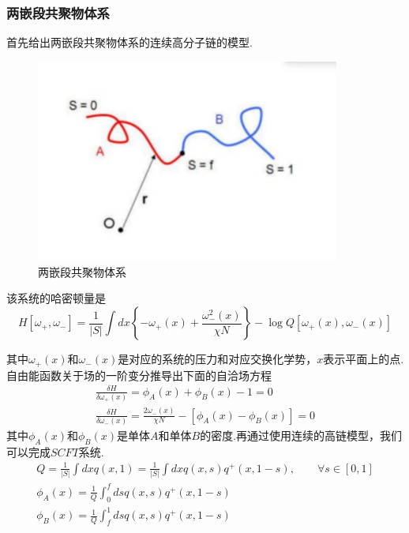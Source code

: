 \documentclass[12pt]{article}
\begin{document}
\begin{CJK}{UTF8}{gkai}
    \subsubsection{两嵌段共聚物体系}
    
      首先给出两嵌段共聚物体系的连续高分子链的模型.\\
      
    \begin{figure}[H] 
     \centering
     \includegraphics[width=10cm]{scft.jpg}
     \caption{两嵌段共聚物体系}
    \end{figure}
    
    该系统的哈密顿量是\\
    \begin{equation}
    H[\omega_+,\omega_-]=\frac{1}{|S|}\int dx\left\lbrace -\omega_+(x)+\frac{\omega_{-}^2(x)}{\chi N}\right\rbrace -\log Q[\omega_+(x),\omega_-(x)]	
    \end{equation}
    
    
    其中$\omega_+(x)$和$\omega_-(x)$是对应的系统的压力和对应交换化学势，$x$表示平面上的点.\\
    
    自由能函数关于场的一阶变分推导出下面的自洽场方程\\

  \begin{gather}
    \frac{\delta H}{\delta \omega_+(x)}=\phi _A(x)+\phi _B(x)-1=0 \\   
    \frac{\delta H}{\delta \omega_-(x)}=\frac{2\omega_-(x)}{\chi N}-[\phi _A(x)-\phi _B(x)]=0
   \end{gather}
   其中$\phi _A(x)$和$\phi _B(x)$是单体$A$和单体$B$的密度.再通过使用连续的高链模型，我们可以完成$SCFT$系统. 
  \begin{gather}
    Q=\frac{1}{|S|}\int dx q(x,1)=\frac{1}{|S|}\int dx q(x,s)q^{+}(x,1-s),\qquad \forall s \in[0,1]  \\
   \phi _A(x)=\frac{1}{Q}\int_0^f ds q(x,s)q^{+}(x,1-s)\\
   \phi _B(x)=\frac{1}{Q}\int_f^1 ds q(x,s)q^{+}(x,1-s)
    \end{gather}
    

\end{CJK}
\end{document}
